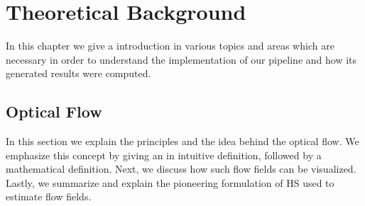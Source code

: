 \chapter{Theoretical Background}
In this chapter we give a introduction in various topics and areas which are necessary in order to understand the implementation of our pipeline and how its generated results were computed. 

\section{Optical Flow}
\label{sec:optical_flow}
In this section we explain the principles and the idea behind the optical flow. We emphasize this concept by giving an in intuitive definition, followed by a mathematical definition. Next, we discuss how such flow fields can be visualized. Lastly, we summarize and explain the pioneering formulation of HS used to estimate flow fields.

